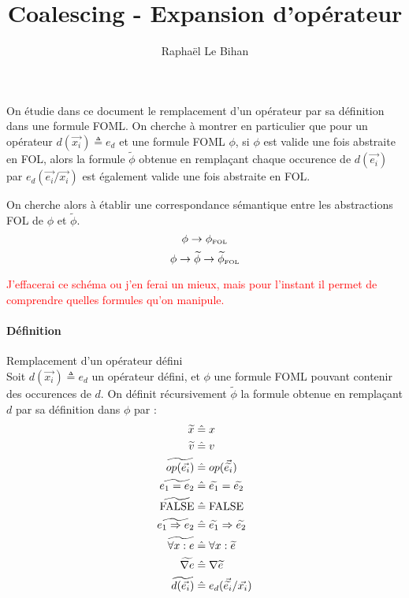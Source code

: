 \documentclass[12pt]{article}
\title{Coalescing - Expansion d'opérateur}
\author{Raphaël Le Bihan}
\newcommand{\defeq}{\ensuremath{\; \hat{=} \;}}
\newcommand{\FOL}{\ensuremath{\textup{\tiny{}FOL}}}
\newcommand{\raph}[1]{\textcolor{red}{#1}}
\begin{document}
\maketitle

On étudie dans ce document le remplacement d'un opérateur par sa définition dans une formule FOML.
On cherche à montrer en particulier que pour un opérateur $d(\vec{x_i}) \triangleq e_d$ et une formule FOML $\phi$, si $\phi$ est valide une fois abstraite en FOL, alors la formule $\widetilde{\phi}$ obtenue en remplaçant chaque occurence de $d(\vec{e_i})$ par $e_d(\vec{e_i}/\vec{x_i})$ est également valide une fois abstraite en FOL.

On cherche alors à établir une correspondance sémantique entre les abstractions FOL de $\phi$ et $\widetilde{\phi}$.
\[
  \phi \to \phi_\FOL
\]
\[
  \phi \to \widetilde{\phi} \to \widetilde{\phi}_\FOL
\]

\raph{%
  J'effacerai ce schéma ou j'en ferai un mieux, mais pour l'instant il permet de comprendre quelles formules qu'on manipule.}

\paragraph{Définition} Remplacement d'un opérateur défini\\
Soit $d(\vec{x_i}) \triangleq e_d$ un opérateur défini, et $\phi$ une formule FOML pouvant contenir des occurences de $d$.
On définit récursivement $\widetilde{\phi}$ la formule obtenue en remplaçant $d$ par sa définition dans $\phi$ par :
\begin{align*}
  \widetilde{x} &\defeq x \\
  \widetilde{v} &\defeq v \\
  \widetilde{op(\vec{e_i})} &\defeq op(\vec{\widetilde{e_i}}) \\
  \widetilde{e_1 = e_2} &\defeq \widetilde{e_1} = \widetilde{e_2} \\
  \widetilde{\textup{FALSE}} &\defeq \textup{FALSE} \\
  \widetilde{e_1 \Rightarrow e_2} &\defeq \widetilde{e_1} \Rightarrow \widetilde{e_2} \\
  \widetilde{\forall x : e } &\defeq \forall x : \widetilde{e} \\
  \widetilde{\nabla e} &\defeq \nabla \widetilde{e} \\
  \widetilde{d(\vec{e_i})} &\defeq e_d(\vec{\widetilde{e_i}}/\vec{x_i})
\end{align*}
\end{document}
